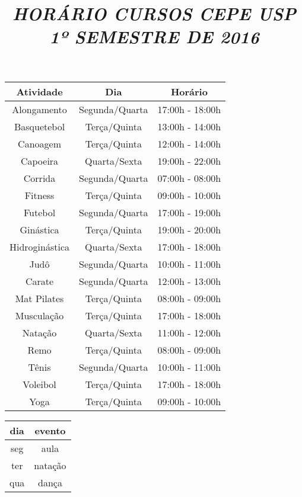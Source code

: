 \documentclass[12pt]{memoir}
\begin{document}
 
\title{\emph{\textbf{HORÁRIO CURSOS CEPE USP\\
1º SEMESTRE DE 2016}}}
\date{}
\maketitle


\begin{center}
\begin{tabular}{|@{\hspace*{1cm}}c@{\hspace*{1cm}}|@{\hspace*{1cm}}c@{\hspace*{1cm}}|@{\hspace*{1cm}}c@{\hspace*{1cm}|}}
\hline
Atividade      &   Dia             & Horário\\ 
\hline
Alongamento    & Segunda/Quarta    & 17:00h - 18:00h\\
\hline
Basquetebol    & Terça/Quinta      & 13:00h - 14:00h\\
\hline
Canoagem       & Terça/Quinta      & 12:00h - 14:00h\\
\hline
Capoeira       & Quarta/Sexta      & 19:00h - 22:00h\\
\hline
Corrida        & Segunda/Quarta    & 07:00h - 08:00h\\
\hline
Fitness        & Terça/Quinta      & 09:00h - 10:00h\\
\hline
Futebol        & Segunda/Quarta    & 17:00h - 19:00h\\
\hline
Ginástica      & Terça/Quinta      & 19:00h - 20:00h\\
\hline
Hidroginástica & Quarta/Sexta      & 17:00h - 18:00h\\
\hline
Judô           & Segunda/Quarta    & 10:00h - 11:00h\\
\hline
Carate         & Segunda/Quarta    & 12:00h - 13:00h\\
\hline
Mat Pilates    & Terça/Quinta      & 08:00h - 09:00h\\
\hline
Musculação     & Terça/Quinta      & 17:00h - 18:00h\\
\hline
Natação        & Quarta/Sexta      & 11:00h - 12:00h\\
\hline
Remo           & Terça/Quinta      & 08:00h - 09:00h\\
\hline
Tênis          & Segunda/Quarta    & 10:00h - 11:00h\\
\hline
Voleibol       & Terça/Quinta      & 17:00h - 18:00h\\
\hline
Yoga           & Terça/Quinta      & 09:00h - 10:00h\\
\hline
\end{tabular}
\end{center}

\begin{tabular}{cc}
\textbf{dia} & \textbf{evento}  \\
\hline
seg          & aula    \\
ter          & natação \\
qua          & dança   \\
\hline
\end{tabular}
\end{document}
